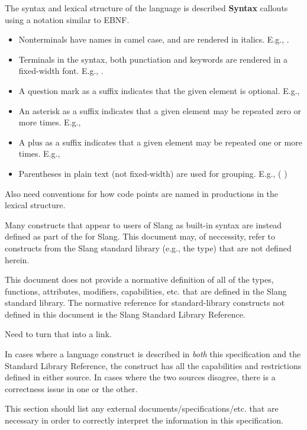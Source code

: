 The syntax and lexical structure of the language is described \textbf{Syntax} callouts using a notation similar to EBNF.

\begin{itemize}
    \item{Nonterminals have names in camel case, and are rendered in italics. E.g., .}
    \item{Terminals in the syntax, both punctiation and keywords are rendered in a fixed-width font. E.g., .}
    \item{A question mark as a suffix indicates that the given element is optional. E.g., \SynOpt}
    \item{An asterisk as a suffix indicates that a given element may be repeated zero or more times. E.g., \SynStar}
    \item{A plus as a suffix indicates that a given element may be repeated one or more times. E.g., \SynPlus}
    \item{Parentheses in plain text (not fixed-width) are used for grouping. E.g.,  (\code{,} )}
\end{itemize}

\begin{Incomplete}
Also need conventions for how code points are named in productions in the lexical structure.    
\end{Incomplete}



Many constructs that appear to users of Slang as built-in syntax are instead defined as part of the  for Slang.
This document may, of neccessity, refer to constructs from the Slang standard library (e.g., the  type) that are not defined herein.

This document does not provide a normative definition of all of the types, functions, attributes, modifiers, capabilities, etc. that are defined in the Slang standard library.
The normative reference for standard-library constructs not defined in this document is the Slang Standard Library Reference.

\begin{TODO}
Need to turn that into a link.
\end{TODO}

In cases where a language construct is described in \emph{both} this specification and the Standard Library Reference, the construct has all the capabilities and restrictions defined in either source.
In cases where the two sources disagree, there is a correctness issue in one or the other.


\begin{TODO}
This section should list any external documents/specifications/etc. that are necessary in order to correctly interpret the information in this specification.
\end{TODO}